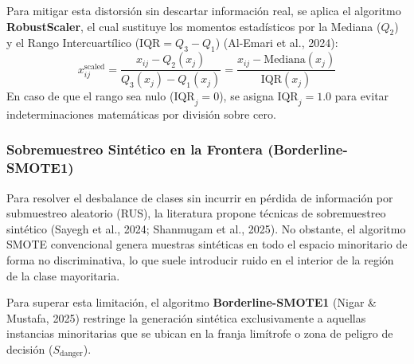 Para mitigar esta distorsión sin descartar información real, se aplica el algoritmo \textbf{RobustScaler}, el cual sustituye los momentos estadísticos por la Mediana ($Q_2$) y el Rango Intercuartílico ($\mathrm{IQR} = Q_3 - Q_1$) (Al-Emari et al., 2024):
\begin{equation}
x_{ij}^{\mathrm{scaled}} = \frac{x_{ij} - Q_2(x_j)}{Q_3(x_j) - Q_1(x_j)} = \frac{x_{ij} - \mathrm{Mediana}(x_j)}{\mathrm{IQR}(x_j)}
\end{equation}
En caso de que el rango sea nulo ($\mathrm{IQR}_j = 0$), se asigna $\mathrm{IQR}_j = 1.0$ para evitar indeterminaciones matemáticas por división sobre cero.

\subsubsection{Sobremuestreo Sintético en la Frontera (Borderline-SMOTE1)}
Para resolver el desbalance de clases sin incurrir en pérdida de información por submuestreo aleatorio (RUS), la literatura propone técnicas de sobremuestreo sintético (Sayegh et al., 2024; Shanmugam et al., 2025). No obstante, el algoritmo SMOTE convencional genera muestras sintéticas en todo el espacio minoritario de forma no discriminativa, lo que suele introducir ruido en el interior de la región de la clase mayoritaria.

Para superar esta limitación, el algoritmo \textbf{Borderline-SMOTE1} (Nigar \& Mustafa, 2025) restringe la generación sintética exclusivamente a aquellas instancias minoritarias que se ubican en la franja limítrofe o zona de peligro de decisión ($S_{\mathrm{danger}}$).

